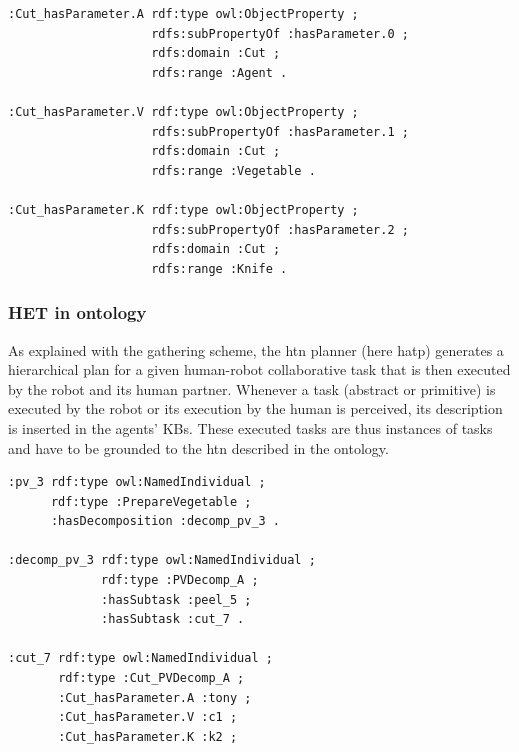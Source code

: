 \begin{lstlisting}[frame=single, basicstyle=\scriptsize\ttfamily, label={lst:chap6_owl_params}, caption={Description of the \textit{hasParameter} property specifications for the parameters (resp. the agent performing the task, the cut vegetable, and the used knife) of the \textit{Cut} primitive task in the OWL language using the Turle syntax.},captionpos=b, style=OwlTurtle]
:Cut_hasParameter.A rdf:type owl:ObjectProperty ;
                    rdfs:subPropertyOf :hasParameter.0 ;
                    rdfs:domain :Cut ;
                    rdfs:range :Agent .

:Cut_hasParameter.V rdf:type owl:ObjectProperty ;
                    rdfs:subPropertyOf :hasParameter.1 ;
                    rdfs:domain :Cut ;
                    rdfs:range :Vegetable .

:Cut_hasParameter.K rdf:type owl:ObjectProperty ;
                    rdfs:subPropertyOf :hasParameter.2 ;
                    rdfs:domain :Cut ;
                    rdfs:range :Knife .
\end{lstlisting}

\subsubsection{HET in ontology}

As explained with the gathering scheme, the \acrshort{htn} planner (here \acrshort{hatp}) generates a hierarchical plan for a given human-robot collaborative task that is then executed by the robot and its human partner. Whenever a task (abstract or primitive) is executed by the robot or its execution by the human is perceived, its description is inserted in the agents' KBs. These executed tasks are thus instances of tasks and have to be grounded to the \acrshort{htn} described in the ontology.

\begin{lstlisting}[frame=single, basicstyle=\scriptsize\ttfamily, label={lst:chap6_owl_plan}, caption={A partial description of the initiation of a decomposition of a PrepareVegetable task and its primitive Cut task resulting from a plan and linked to the description of the domain. Description is provided in the OWL language using the Turle syntax.},captionpos=b, style=OwlTurtle_indiv]
:pv_3 rdf:type owl:NamedIndividual ;
      rdf:type :PrepareVegetable ;
      :hasDecomposition :decomp_pv_3 .

:decomp_pv_3 rdf:type owl:NamedIndividual ;
             rdf:type :PVDecomp_A ;
             :hasSubtask :peel_5 ;
             :hasSubtask :cut_7 .

:cut_7 rdf:type owl:NamedIndividual ;
       rdf:type :Cut_PVDecomp_A ;
       :Cut_hasParameter.A :tony ;
       :Cut_hasParameter.V :c1 ;
       :Cut_hasParameter.K :k2 ;
\end{lstlisting}

